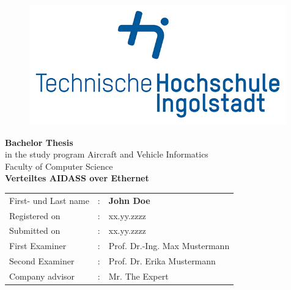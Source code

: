 

\begin{titlepage}	
		\begin{figure}[!h]
			\centering
			\includegraphics[width={0.99\textwidth}]{images/thiRGB.jpg}	
		\end{figure}																			
	
	\begin{center}
		\hrulefill 
	\end{center}
	
	
	\begin{center}	
		\vspace{1cm}
		
		\huge\textbf{
			Bachelor Thesis}\\[2.5em]
		\normalsize
			in the study program Aircraft and Vehicle Informatics\\ Faculty of Computer Science	\\ [7em]
	
		\Large\textbf{Verteiltes AIDASS over Ethernet}	 \\ 

	\end{center}

	\vfill
	
	
	\begin{tabular}{lll}
		First- und Last name &: & \textbf{John Doe}	\\ [3em]
		
		Registered on &:	& xx.yy.zzzz	\\ [1em] %
		Submitted on &:	& xx.yy.zzzz	\\ [3em] %
		
		First Examiner &: 	& Prof. Dr.-Ing. Max Mustermann	\\ [1em]
		Second Examiner &: 	& Prof. Dr. Erika Mustermann	\\[3em]
		
		Company advisor &:	& Mr. The Expert \\ %
	\end{tabular}
	
\end{titlepage}

\restoregeometry